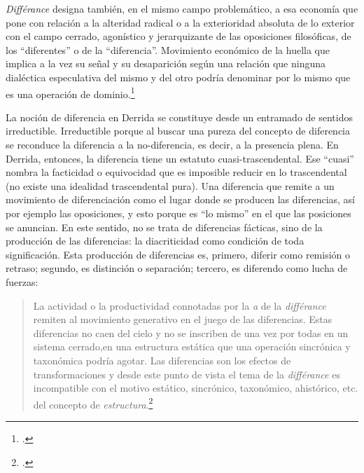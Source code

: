\emph{Différance} designa también, en el mismo campo problemático, a esa economía  que pone con relación a la alteridad radical o a la exterioridad absoluta de lo exterior con el campo cerrado, agonístico y jerarquizante de las oposiciones filosóficas, de los \enquote{diferentes} o de la \enquote{diferencia}. Movimiento económico de la huella que implica a la vez su señal y su desaparición  según una relación que ninguna dialéctica especulativa del mismo y del otro podría denominar por lo mismo que es una operación de dominio.\footcite[9]{@6983-DERRIDA1997}

La noción de diferencia en Derrida se constituye desde un entramado de sentidos irreductible. Irreductible porque al buscar una pureza del concepto de diferencia se reconduce la diferencia a la no-diferencia, es decir, a la presencia plena. En Derrida, entonces, la diferencia tiene un estatuto cuasi-trascendental. Ese \enquote{cuasi} nombra la facticidad o equivocidad que es imposible reducir en lo trascendental (no existe una idealidad trascendental pura). Una diferencia que remite a un movimiento de diferenciación como el lugar donde se producen las diferencias, así por ejemplo las oposiciones, y esto porque es \enquote{lo mismo} en el que las posiciones se anuncian. En este sentido, no se trata de diferencias fácticas, sino de la producción de las diferencias: la diacriticidad como condición de toda significación. Esta producción de diferencias es, primero, diferir como remisión o retraso; segundo, es distinción o separación; tercero, es diferendo como lucha de fuerzas:

\begin{quote}
La actividad o la productividad connotadas por la \emph{a} de la \emph{différance} remiten al movimiento generativo en el juego de las diferencias. Estas diferencias no caen del cielo y no se inscriben de una vez por todas en un sistema cerrado,en una estructura estática que una operación sincrónica y taxonómica podría agotar. Las diferencias son los efectos de transformaciones y desde este punto de vista el tema de la \emph{différance} es incompatible con el motivo estático, sincrónico, taxonómico, ahistórico, etc. del concepto de \emph{estructura}.\footcite[37]{@6983-DERRIDA1997}
\end{quote}

